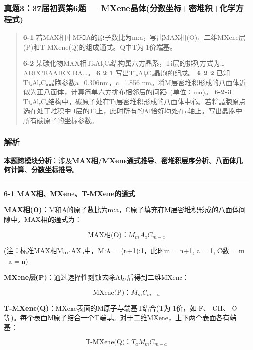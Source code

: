 \documentclass[a4paper,11pt]{ctexart}
\newcommand{\箭}{\ensuremath{\rightarrow}}
\newcommand{\左箭}{\ensuremath{\leftarrow}}
\newcommand{\上箭}{\ensuremath{\uparrow}}
\newcommand{\下箭}{\ensuremath{\downarrow}}
\newcommand{\衡}{\ensuremath{\rightleftharpoons}}
\newcommand{\双箭}{\ensuremath{\leftrightarrow}}
\newcommand{\约等于}{\ensuremath{\approx}}
\newcommand{\小于等于}{\ensuremath{\leq}}
\newcommand{\大于等于}{\ensuremath{\geq}}
\newcommand{\不等于}{\ensuremath{\neq}}
\newcommand{\西格马}{\ensuremath{\sigma}}
\newcommand{\派}{\ensuremath{\pi}}
\begin{document}
\subsubsection{真题3：37届初赛第6题 --- MXene晶体(分数坐标+密堆积+化学方程式)}\label{ux771fux9898337ux5c4aux521dux8d5bux7b2c6ux9898-mxeneux6676ux4f53ux5206ux6570ux5750ux6807ux5bc6ux5806ux79efux5316ux5b66ux65b9ux7a0bux5f0f}

\begin{quote}
\textbf{6-1} 若MAX相中M和A的原子数比为m:a，写出MAX相(O)、二维MXene层(P)和T-MXene(Q)的组成通式。Q中T为-1价端基。

\textbf{6-2} 某碳化物MAX相TiₓAlᵧCᵤ结构属六方晶系，Ti层的排列方式为\ldots ABCCBAABCCBA\ldots。
\textbf{6-2-1} 写出TiₓAlᵧCᵤ晶胞的组成。
\textbf{6-2-2} 已知TiₓAlᵧCᵤ晶胞参数a=0.306nm，c=1.856 nm。将M层密堆积形成的八面体近似为正八面体，计算简单六方排布相邻层的间距d(单位：nm)。
\textbf{6-2-3} TiₓAlᵧCᵤ结构中，碳原子处在Ti层密堆积形成的八面体中心。若将晶胞原点选在处于堆积中B层的Ti上，此时所有的Al恰好均处在c轴上。写出晶胞中所有碳原子的坐标参数。
\end{quote}

\subsubsection{解析}\label{ux89e3ux6790-25}

\textbf{本题跨模块分析}：涉及\textbf{MAX相/MXene通式推导}、\textbf{密堆积层序分析}、\textbf{八面体几何计算}、\textbf{分数坐标推导}。

\begin{center}\rule{0.5\linewidth}{0.5pt}\end{center}

\textbf{6-1 MAX相、MXene、T-MXene的通式}

\textbf{MAX相(O)}：M和A的原子数比为m:a，C原子填充在M层密堆积形成的八面体间隙中。MAX相的通式为：

\[\text{MAX相(O)}：M_m A_a C_{m-a}\]

(注：标准MAX相Mₙ₊\textsubscript{1}AXₙ中，M:A = (n+1):1，此时m = n+1, a = 1, C数 = m - a = n)

\textbf{MXene层(P)}：通过选择性刻蚀去除A层后得到二维MXene：

\[\text{MXene(P)}：M_m C_{m-a}\]

\textbf{T-MXene(Q)}：MXene表面的M原子与端基T结合(T为-1价，如-F、-OH、-O等)。每个表面M原子结合一个T端基。对于二维MXene，上下两个表面各有端基：

\[\text{T-MXene(Q)}：T_a M_m C_{m-a}\]
\end{document}

